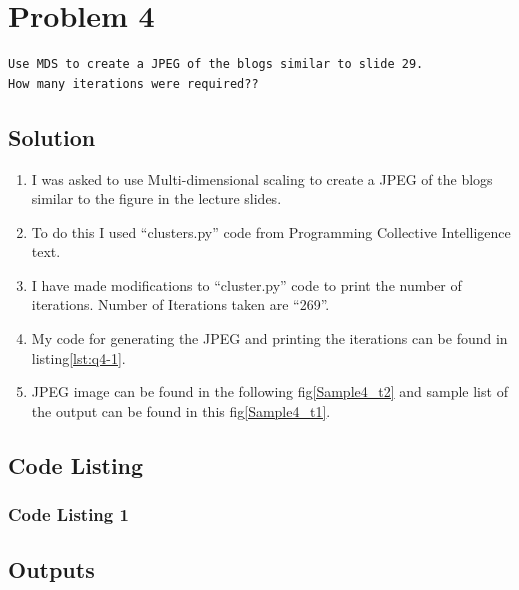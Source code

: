 \section{Problem 4}
\label{part4}
\begin{verbatim}
Use MDS to create a JPEG of the blogs similar to slide 29.  
How many iterations were required??

\end{verbatim}

\subsection{Solution}
\begin{enumerate}
\item I was asked to use Multi-dimensional scaling to create a JPEG of the blogs similar to the figure in the lecture slides.
\item To do this I used ``clusters.py'' code from Programming Collective Intelligence text.
\item I have made modifications to ``cluster.py'' code to print the number of iterations. Number of Iterations taken are ``269''.
\item My code for generating the JPEG and printing the iterations can be found in listing\ref{lst:q4-1}.
\item JPEG image can be found in the following fig\ref{Sample4_t2} and sample list of the output can be found in this fig\ref{Sample4_t1}.
\end{enumerate}
\newpage

\subsection{Code Listing}
\subsubsection{Code Listing 1}


\newpage
\subsection{Outputs}
